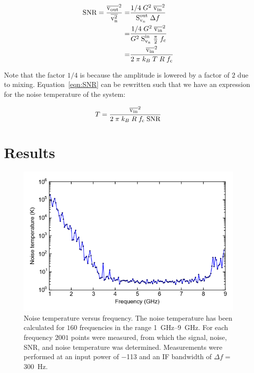 \begin{align}
    \text{SNR} = \frac{\overline{\text{v}_\text{out}}^2}{\overline{\text{v}_\text{n}^2}} = & \frac{1/4 \;G^2 \; \overline{\text{v}_\text{in}}^2}{ \text{S}_{\text{v}_\text{n}}^\text{out} \; \Delta f}\notag\\
        = & \frac{1/4 \; G^2 \; \overline{\text{v}_\text{in}}^2}{G^2 \; \text{S}_{\text{v}_\text{n}}^\text{in} \;\frac{\pi}{2}\;f_\text{c}}\notag\\
        = & \frac{\overline{\text{v}_\text{in}}^2}{2 \; \pi \; k_B \; T \; R \; f_\text{c}}
    \label{eqn:SNR}
\end{align}

Note that the factor $1/4$ is because the amplitude is lowered by a factor of $2$ due to mixing. Equation~\ref{eqn:SNR} can be rewritten such that we have an expression for the noise temperature of the system:

\begin{equation}
    T =\frac{\overline{\text{v}_\text{in}}^2}{2 \; \pi \; k_B \; R \; f_\text{c} \; \text{SNR}}
    \label{eqn:noise temperature}
\end{equation}


\section{Results}
\label{sec:noise_results}
\begin{figure}[h]
    \centering
    \includegraphics[width = .7 \linewidth]{Figures/Noise/noise_temperature_versus_power.png}
    \caption{Noise temperature versus frequency. The noise temperature has been calculated for $160$ frequencies in the range \SIrange{1}{9}{\giga \hertz}. For each frequency $2001$ points were measured, from which the signal, noise, SNR, and noise temperature was determined. Measurements were performed at an input power of \SI{-113}{\dBm} and an IF bandwidth of $\Delta f = $\SI{300}{\hertz}.}
    \label{fig:Noise temperature}
\end{figure}

